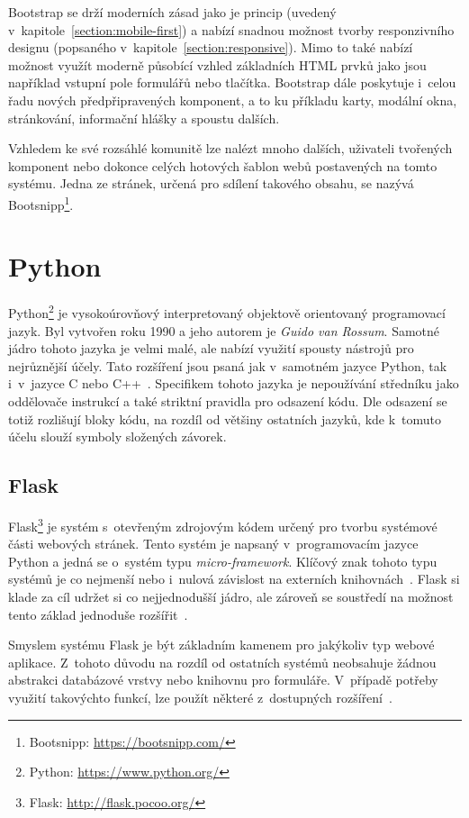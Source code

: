Bootstrap se drží moderních zásad jako je princip  (uvedený v~kapitole~\ref{section:mobile-first}) a nabízí snadnou možnost tvorby responzivního designu (popsaného v~kapitole~\ref{section:responsive}). Mimo to také nabízí možnost využít moderně působící vzhled základních HTML prvků jako jsou například vstupní pole formulářů nebo tlačítka. Bootstrap dále poskytuje i~celou řadu nových předpřipravených komponent, a to ku příkladu karty, modální okna, stránkování, informační hlášky a spoustu dalších.

Vzhledem ke své rozsáhlé komunitě lze nalézt mnoho dalších, uživateli tvořených komponent nebo dokonce celých hotových šablon webů postavených na tomto systému. Jedna ze stránek, určená pro sdílení takového obsahu, se nazývá Bootsnipp\footnote{Bootsnipp: \url{https://bootsnipp.com/}}.



\section{Python}
Python\footnote{Python: \url{https://www.python.org/}} je vysokoúrovňový interpretovaný objektově orientovaný programovací jazyk. Byl vytvořen roku 1990 a jeho autorem je \emph{Guido van Rossum}. Samotné jádro tohoto jazyka je velmi malé, ale nabízí využití spousty nástrojů pro nejrůznější účely. Tato rozšíření jsou psaná jak v~samotném jazyce Python, tak i~v~jazyce C nebo C++~\cite{bib:python}. Specifikem tohoto jazyka je nepoužívání středníku jako oddělovače instrukcí a také striktní pravidla pro odsazení kódu. Dle odsazení se totiž rozlišují bloky kódu, na rozdíl od většiny ostatních jazyků, kde k~tomuto účelu slouží symboly složených závorek. 


\subsection{Flask}
Flask\footnote{Flask: \url{http://flask.pocoo.org/}} je systém s~otevřeným zdrojovým kódem určený pro tvorbu systémové části webových stránek. Tento systém je napsaný v~programovacím jazyce Python a jedná se o~systém typu \emph{micro-framework}. Klíčový znak tohoto typu systémů je co nejmenší nebo i~nulová závislost na externích knihovnách~\cite{bib:flask-doc}.
Flask si klade za cíl udržet si co nejjednodušší jádro, ale zároveň se soustředí na možnost tento základ jednoduše rozšířit~\cite{bib:flask-pym}.

Smyslem systému Flask je být základním kamenem pro jakýkoliv typ webové aplikace. Z~tohoto důvodu na rozdíl od ostatních systémů neobsahuje žádnou abstrakci databázové vrstvy nebo knihovnu pro formuláře. V~případě potřeby využití takovýchto funkcí, lze použít některé z~dostupných rozšíření~\cite{bib:flask-design}.

